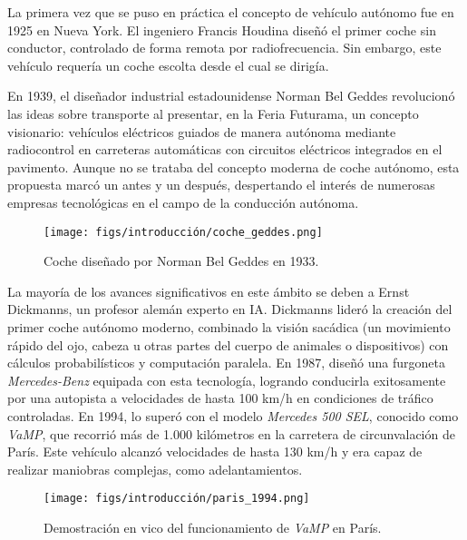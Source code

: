 La primera vez que se puso en práctica el concepto de vehículo autónomo fue en 1925 en Nueva York. El ingeniero Francis Houdina diseñó el primer coche sin conductor, controlado de forma remota por radiofrecuencia. Sin embargo, este vehículo requería un coche escolta desde el cual se dirigía.

En 1939, el diseñador industrial estadounidense Norman Bel Geddes revolucionó las ideas sobre transporte al presentar, en la Feria Futurama, un concepto visionario: vehículos eléctricos guiados de manera autónoma mediante radiocontrol en carreteras automáticas con circuitos eléctricos integrados en el pavimento. Aunque no se trataba del concepto moderna de coche autónomo, esta propuesta marcó un antes y un después, despertando el interés de numerosas empresas tecnológicas en el campo de la conducción autónoma.

\begin{figure} [ht]
  \begin{center}
    \texttt{[image: figs/introducción/coche\_geddes.png]}
  \end{center}
  \caption{Coche diseñado por Norman Bel Geddes en 1933.}
  \label{coche-geddes}
  \end{figure}

La mayoría de los avances significativos en este ámbito se deben a Ernst Dickmanns, un profesor alemán experto en \ac{IA}. Dickmanns lideró la creación del primer coche autónomo moderno, combinado la visión sacádica (un movimiento
rápido del ojo, cabeza u otras partes del cuerpo de animales o dispositivos) con cálculos probabilísticos y computación paralela. En 1987, diseñó una furgoneta \textit{Mercedes-Benz} equipada con esta tecnología, logrando conducirla exitosamente por una autopista a velocidades de hasta 100 km/h en condiciones de tráfico controladas. En 1994, lo superó con el modelo  \textit{Mercedes 500 SEL}, conocido como \textit{VaMP}, que recorrió más de 1.000 kilómetros en la carretera de circunvalación de París. Este vehículo alcanzó velocidades de hasta 130 km/h y era capaz de realizar maniobras complejas, como adelantamientos.

\begin{figure}[ht]
  \begin{center}
    \texttt{[image: figs/introducción/paris\_1994.png]}
  \end{center}
  \caption{Demostración en vico del funcionamiento de \textit{VaMP} en París.}
  \label{coche-geddes}
\end{figure}


